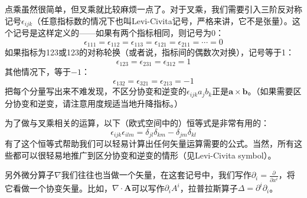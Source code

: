 \documentclass{ctexart}
\begin{document}
点乘虽然很简单，但叉乘就比较麻烦一点了。对于叉乘，我们需要引入三阶反对称记号$\epsilon_{ijk}$（任意指标数的情况下也叫Levi-Civita记号，严格来讲，它不是张量）。这个记号是这样定义的——如果有两个指标相同，则记号为0：
\begin{equation}
\epsilon_{111}=\epsilon_{112}=\epsilon_{113}=\epsilon_{121}=\epsilon_{211}=\cdots=0
\end{equation}
如果指标为123或123的对称轮换（或者说，指标间的偶数次对换），记号等于1：
\begin{equation}
\epsilon_{123}=\epsilon_{231}=\epsilon_{312}=1
\end{equation}
其他情况下，等于$-1$：
\begin{equation}
\epsilon_{132}=\epsilon_{321}=\epsilon_{213}=-1
\end{equation}
把每个分量写出来不难发现，不区分协变和逆变的$\epsilon_{ijk}a_jb_k$正是$\bm{a}\times\bm{b}$。（如果需要区分协变和逆变，请注意用度规适当地升降指标。）

为了做与叉乘相关的运算，以下（欧式空间中的）恒等式是非常有用的：
\begin{equation}
\epsilon_{ijk}\epsilon_{ilm}=\delta_{jl}\delta_{km}-\delta_{jm}\delta_{kl}
\end{equation}
有了这个恒等式帮助我们可以轻易计算出任何矢量运算需要的公式。当然，所有这些都可以很轻易地推广到区分协变和逆变的情形（见Levi-Civita symbol）。

另外微分算子$\nabla$我们往往也当做一个矢量，在这套记号中，我们写作$\partial_i=\frac{\partial}{\partial x^i}$，将它看做一个协变矢量。比如，$\nabla\cdot\bm{A}$可以写作$\partial_iA^i$，拉普拉斯算子$\Delta=\partial^i\partial_i$。
\end{document}
